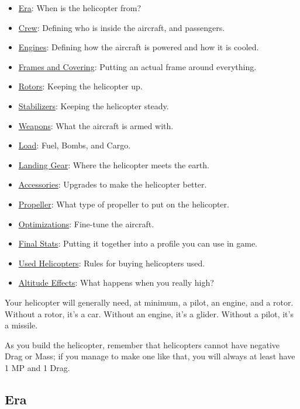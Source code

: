 \documentclass{article}
\begin{document}
\begin{itemize}
    \item  \hyperref[_Era]{Era}: When is the helicopter from?
    \item  \hyperref[_Crew]{Crew}: Defining who is inside the aircraft, and passengers.
    \item  \hyperref[_Engines]{Engines}: Defining how the aircraft is powered and how it is cooled.
    \item  \hyperref[_Frame_and_Covering]{Frames and Covering}: Putting an actual frame around everything.
    \item  \hyperref[_Rotors]{Rotors}: Keeping the helicopter up.
    \item  \hyperref[_Stabilizers]{Stabilizers}: Keeping the helicopter steady.
    \item  \hyperref[_Weapons]{Weapons}: What the aircraft is armed with.
    \item  \hyperref[_Load]{Load}: Fuel, Bombs, and Cargo.
    \item  \hyperref[_Landing_Gear]{Landing Gear}: Where the helicopter meets the earth.
    \item  \hyperref[_Upgrades]{Accessories}: Upgrades to make the helicopter better.
    \item  \hyperref[_Propeller]{Propeller}: What type of propeller to put on the helicopter.
    \item  \hyperref[_Optimization]{Optimizations}: Fine-tune the aircraft.
    \item  \hyperref[_Final_Calculations]{Final Stats}: Putting it together into a profile you can use in game.
    \item  \hyperref[_Used_Helicopters]{Used Helicopters}: Rules for buying helicopters used.
    \item  \hyperref[_Altitude_Rules]{Altitude Effects}: What happens when you really high?
\end{itemize}

Your helicopter will generally need, at minimum, a pilot, an engine, and a
rotor. Without a rotor, it's a car. Without an engine, it's a glider.
Without a pilot, it's a missile.

As you build the helicopter, remember that helicopters cannot have negative Drag or
Mass; if you manage to make one like that, you will always at least have
1 MP and 1 Drag.

\subsection{Era}
\label{_Era}
\end{document}
